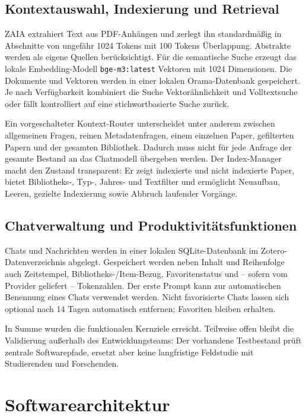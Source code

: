 \documentclass[11pt,a4paper,oneside,parskip=half]{scrartcl}
\begin{document}
\subsection{Kontextauswahl, Indexierung und Retrieval}

ZAIA extrahiert Text aus PDF-Anhängen und zerlegt ihn standardmäßig in Abschnitte
von ungefähr 1024 Tokens mit 100 Tokens Überlappung. Abstrakte werden als eigene
Quellen berücksichtigt. Für die semantische Suche erzeugt das lokale
Embedding-Modell \texttt{bge-m3:latest} Vektoren mit 1024 Dimensionen. Die
Dokumente und Vektoren werden in einer lokalen Orama-Datenbank gespeichert. Je
nach Verfügbarkeit kombiniert die Suche Vektorähnlichkeit und Volltextsuche oder
fällt kontrolliert auf eine stichwortbasierte Suche zurück.

Ein vorgeschalteter Kontext-Router unterscheidet unter anderem zwischen
allgemeinen Fragen, reinen Metadatenfragen, einem einzelnen Paper, gefilterten
Papern und der gesamten Bibliothek. Dadurch muss nicht für jede Anfrage der
gesamte Bestand an das Chatmodell übergeben werden. Der Index-Manager macht den
Zustand transparent: Er zeigt indexierte und nicht indexierte Paper, bietet
Bibliotheks-, Typ-, Jahres- und Textfilter und ermöglicht Neuaufbau, Leeren,
gezielte Indexierung sowie Abbruch laufender Vorgänge.

\subsection{Chatverwaltung und Produktivitätsfunktionen}

Chats und Nachrichten werden in einer lokalen SQLite-Datenbank im
Zotero-Datenverzeichnis abgelegt. Gespeichert werden neben Inhalt und Reihenfolge
auch Zeitstempel, Bibliotheks-/Item-Bezug, Favoritenstatus und -- sofern vom
Provider geliefert -- Tokenzahlen. Der erste Prompt kann zur automatischen
Benennung eines Chats verwendet werden. Nicht favorisierte Chats lassen sich
optional nach 14 Tagen automatisch entfernen; Favoriten bleiben erhalten.

In Summe wurden die funktionalen Kernziele erreicht. Teilweise offen bleibt die
Validierung außerhalb des Entwicklungsteams: Der vorhandene Testbestand prüft
zentrale Softwarepfade, ersetzt aber keine langfristige Feldstudie mit
Studierenden und Forschenden.

\section{Softwarearchitektur}
\end{document}
